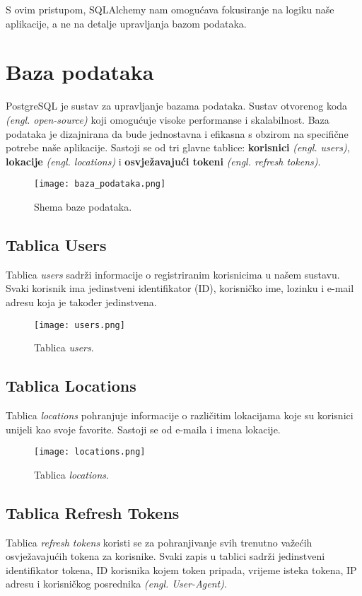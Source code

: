 \documentclass[times, utf8, zavrsni]{fer}
\begin{document}
S ovim pristupom, SQLAlchemy nam omogućava fokusiranje na logiku naše aplikacije, a ne na detalje upravljanja bazom podataka.
\newpage

\section{Baza podataka}

PostgreSQL je sustav za upravljanje bazama podataka. Sustav otvorenog koda \textit{(engl. open-source)} koji omogućuje visoke performanse i skalabilnost. Baza podataka je dizajnirana da bude jednostavna i efikasna s obzirom na specifične potrebe naše aplikacije. Sastoji se od tri glavne tablice: \textbf{korisnici }\textit{(engl. users)}, \textbf{lokacije}      \textit{ (engl. locations)} i \textbf{osvježavajući tokeni} \textit{(engl. refresh tokens)}.

\begin{figure}[h]
\centering
\texttt{[image: baza\_podataka.png]}
\caption{Shema baze podataka.}
\end{figure}

\subsection{Tablica Users}
Tablica \textit{users} sadrži informacije o registriranim korisnicima u našem sustavu. Svaki korisnik ima jedinstveni identifikator (ID), korisničko ime, lozinku i e-mail adresu koja je također jedinstvena.\begin{figure}[h]
\centering
\texttt{[image: users.png]}
\caption{Tablica \textit{users}.}
\end{figure}
\subsection{Tablica Locations}
Tablica \textit{locations} pohranjuje informacije o različitim lokacijama koje su korisnici unijeli kao svoje favorite. Sastoji se od e-maila i imena lokacije.
\begin{figure}
\centering
\texttt{[image: locations.png]}
\caption{Tablica \textit{locations}.}
\end{figure}
\newpage
\subsection{Tablica Refresh Tokens}
Tablica \textit{refresh tokens} koristi se za pohranjivanje svih trenutno važećih osvježavajućih tokena za korisnike. Svaki zapis u tablici sadrži jedinstveni identifikator tokena, ID korisnika kojem token pripada, vrijeme isteka tokena, IP adresu i korisničkog posrednika \textit{(engl. User-Agent)}.
\newline
\end{document}
